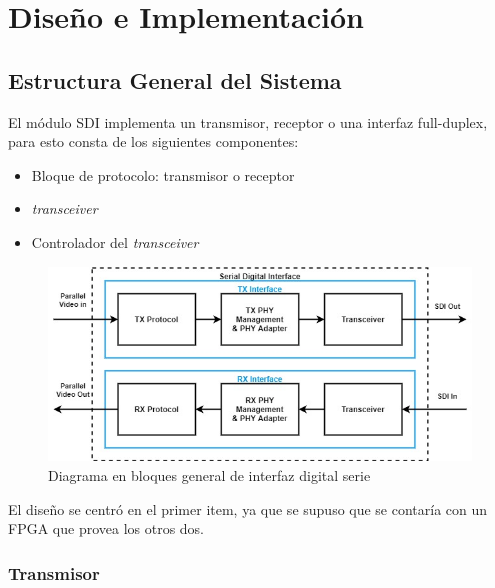 \chapter{Diseño e Implementación}\label{Chapter3}


\section{Estructura General del Sistema}

  El módulo SDI implementa un transmisor, receptor o una interfaz full-duplex,
  para esto consta de los siguientes componentes:

  \begin{itemize}
      \item Bloque de protocolo: transmisor o receptor
      \item \textit{transceiver}
      \item Controlador del \textit{transceiver}
  \end{itemize}

  \vspace{1cm}
  \begin{figure}[htbp]
      \centering
      \includegraphics[width=\linewidth]{./Figures/sdi.jpg}
      \caption{Diagrama en bloques general de interfaz digital serie}\label{fig:sdi2}
  \end{figure}
  \vspace{1cm}

  El diseño se centró en el primer item, ya que se supuso que  se contaría con
  un FPGA que provea los otros dos.

\subsection{Transmisor}

